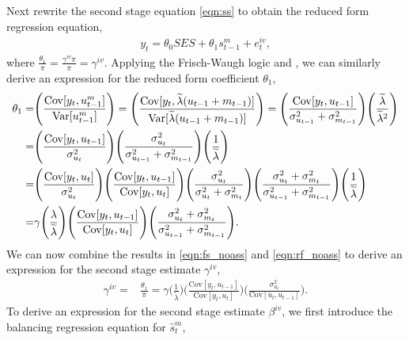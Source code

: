 %
Next rewrite the second stage equation \eqref{eqn:ss} to obtain the reduced form regression equation,  
\begin{align}\label{eqn:rf}
    y_t= \theta_0 SES +  \theta_1 s_{t-1}^m+e_t^{iv},
\end{align}
where $\frac{\theta_1}{\pi}=\frac{\gamma^{iv} \pi}{\pi}=\gamma^{iv}$. Applying the Frisch-Waugh logic and , we can similarly derive an expression for the reduced form coefficient $\theta_1$,
\begin{align}\label{eqn:rf_noass}
    \theta_1=&\Bigg(\frac{\mathrm{Cov}[y_{t},u^m_{t-1}]}{\mathrm{Var}[u^m_{t-1}]}\Bigg)=\Bigg(\frac{\mathrm{Cov}[y_{t},\widetilde{\lambda}(u_{t-1}+m_{t-1})]}{\mathrm{Var}[\widetilde{\lambda}(u_{t-1}+m_{t-1})]}\Bigg)=
    \Bigg(\frac{\mathrm{Cov}[y_{t} ,u_{t-1}]}{\sigma_{u_{t-1}}^2+\sigma_{m_{t-1}}^2}\Bigg) \Bigg(\frac{\widetilde{\lambda}}{\widetilde{\lambda}^2}\Bigg)  \\ \notag
    =& \Bigg(\frac{\mathrm{Cov}[y_{t},u_{t-1}]}{\sigma_{u_{t}}^2}\Bigg) \Bigg( \frac{\sigma_{u_{t}}^2}{\sigma_{u_{t-1}}^2+\sigma_{m_{t-1}}^2}\Bigg) \Bigg(\frac{1}{\widetilde{\lambda}}\Bigg)  \\ \notag
     =& \Bigg(\frac{\mathrm{Cov}[y_{t},u_{t}]}{\sigma_{u_{t}}^2}\Bigg) \Bigg(\frac{\mathrm{Cov}[y_{t},u_{t-1}]}{\mathrm{Cov}[y_{t},u_{t}]}\Bigg)  \Bigg( \frac{\sigma_{u_{t}}^2}{\sigma_{u_{t}}^2+\sigma_{m_{t}}^2}\Bigg) \Bigg( \frac{\sigma_{u_{t}}^2+\sigma_{m_{t}}^2}{\sigma_{u_{t-1}}^2+\sigma_{m_{t-1}}^2}\Bigg) \Bigg(\frac{1}{\widetilde{\lambda}}\Bigg)  \\ \notag
     =& \gamma  \Bigg(\frac{\lambda}{\widetilde{\lambda}}\Bigg) \Bigg(\frac{\mathrm{Cov}[y_{t},u_{t-1}]}{\mathrm{Cov}[y_{t},u_{t}]}\Bigg) \Bigg( \frac{\sigma_{u_{t}}^2+\sigma_{m_{t}}^2}{\sigma_{u_{t-1}}^2+\sigma_{m_{t-1}}^2}\Bigg).
\end{align}
%
We can now combine the results in \eqref{eqn:fs_noass} and \eqref{eqn:rf_noass} to derive an expression for the second stage estimate $\gamma^{iv}$,
\begin{align}\label{eqn:gammaiv_noass}
    \gamma^{iv}=&\frac{\theta_1}{\pi}=\gamma \Bigg(\frac{1}{\widetilde{\lambda}}\Bigg)\Bigg(\frac{\mathrm{Cov}[y_{t},u_{t-1}]}{\mathrm{Cov}[y_{t},u_{t}]}\Bigg)\Bigg( \frac{\sigma_{u_{t}}^2}{\mathrm{Cov}[u_{t},u_{t-1}]}\Bigg).
\end{align}
To derive an expression for the second stage estimate $\beta^{iv}$, we first introduce the balancing regression equation for $\widehat{s}_{t}^m$,

